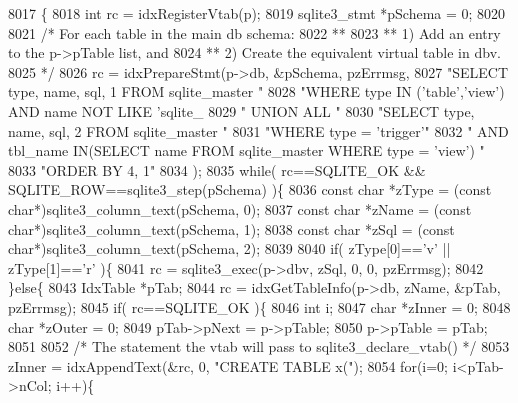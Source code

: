 \begin{DoxyCode}
8017                                                                  \{
8018   \textcolor{keywordtype}{int} rc = idxRegisterVtab(p);
8019   sqlite3_stmt *pSchema = 0;
8020 
8021   \textcolor{comment}{/* For each table in the main db schema:}
8022 \textcolor{comment}{  **}
8023 \textcolor{comment}{  **   1) Add an entry to the p->pTable list, and}
8024 \textcolor{comment}{  **   2) Create the equivalent virtual table in dbv.}
8025 \textcolor{comment}{  */}
8026   rc = idxPrepareStmt(p->db, &pSchema, pzErrmsg,
8027       \textcolor{stringliteral}{"SELECT type, name, sql, 1 FROM sqlite\_master "}
8028       \textcolor{stringliteral}{"WHERE type IN ('table','view') AND name NOT LIKE 'sqlite\_%
8029       \textcolor{stringliteral}{" UNION ALL "}
8030       \textcolor{stringliteral}{"SELECT type, name, sql, 2 FROM sqlite\_master "}
8031       \textcolor{stringliteral}{"WHERE type = 'trigger'"}
8032       \textcolor{stringliteral}{"  AND tbl\_name IN(SELECT name FROM sqlite\_master WHERE type = 'view') "}
8033       \textcolor{stringliteral}{"ORDER BY 4, 1"}
8034   );
8035   \textcolor{keywordflow}{while}( rc==SQLITE_OK && SQLITE_ROW==sqlite3_step(pSchema) )\{
8036     \textcolor{keyword}{const} \textcolor{keywordtype}{char} *zType = (\textcolor{keyword}{const} \textcolor{keywordtype}{char}*)sqlite3_column_text(pSchema, 0);
8037     \textcolor{keyword}{const} \textcolor{keywordtype}{char} *zName = (\textcolor{keyword}{const} \textcolor{keywordtype}{char}*)sqlite3_column_text(pSchema, 1);
8038     \textcolor{keyword}{const} \textcolor{keywordtype}{char} *zSql = (\textcolor{keyword}{const} \textcolor{keywordtype}{char}*)sqlite3_column_text(pSchema, 2);
8039 
8040     \textcolor{keywordflow}{if}( zType[0]==\textcolor{charliteral}{'v'} || zType[1]==\textcolor{charliteral}{'r'} )\{
8041       rc = sqlite3_exec(p->dbv, zSql, 0, 0, pzErrmsg);
8042     \}\textcolor{keywordflow}{else}\{
8043       IdxTable *pTab;
8044       rc = idxGetTableInfo(p->db, zName, &pTab, pzErrmsg);
8045       \textcolor{keywordflow}{if}( rc==SQLITE_OK )\{
8046         \textcolor{keywordtype}{int} i;
8047         \textcolor{keywordtype}{char} *zInner = 0;
8048         \textcolor{keywordtype}{char} *zOuter = 0;
8049         pTab->pNext = p->pTable;
8050         p->pTable = pTab;
8051 
8052         \textcolor{comment}{/* The statement the vtab will pass to sqlite3\_declare\_vtab() */}
8053         zInner = idxAppendText(&rc, 0, \textcolor{stringliteral}{"CREATE TABLE x("});
8054         \textcolor{keywordflow}{for}(i=0; i<pTab->nCol; i++)\{
}
\end{DoxyCode}
